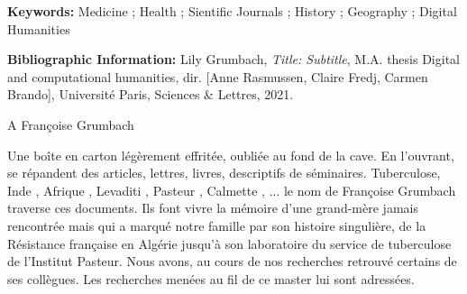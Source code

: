\documentclass[a4paper,oneside,12pt]{book}
\begin{document}
\medskip

\textbf{Keywords:} Medicine ; Health ; Sientific Journals ; History ; Geography ; Digital Humanities

\textbf{Bibliographic Information:} Lily Grumbach, \textit{Title: Subtitle}, M.A. thesis \og Digital and computational humanities\fg{}, dir. [Anne Rasmussen, Claire Fredj, Carmen Brando], Université Paris, Sciences \& Lettres, 2021.


\clearpage
\thispagestyle{empty}
\cleardoublepage

\tableofcontents

\cleardoublepage
\cleardoublepage



\begin{flushright}
A Françoise Grumbach
\end{flushright}

\begin{changemargin}{5cm}{0cm} 
\small
Une boîte en carton légèrement effritée, oubliée au fond de la cave. En l'ouvrant, se répandent des articles, lettres, livres, descriptifs de séminaires. \og Tuberculose\fg, \og Inde \fg, \og Afrique \fg, \og Levaditi \fg, \og Pasteur \fg, \og Calmette \fg, ... le nom de Françoise Grumbach traverse ces documents. 
Ils font vivre la mémoire d'une grand-mère jamais rencontrée mais qui a marqué notre famille par son histoire singulière, de la Résistance française en Algérie jusqu'à son laboratoire du service de tuberculose de l'Institut Pasteur. Nous avons, au cours de nos recherches retrouvé certains de ses collègues. Les recherches menées au fil de ce master lui sont adressées. 
\end{changemargin}

\cleardoublepage
\medskip
\medskip
\medskip
\mainmatter








\printbibliography



\end{document}

